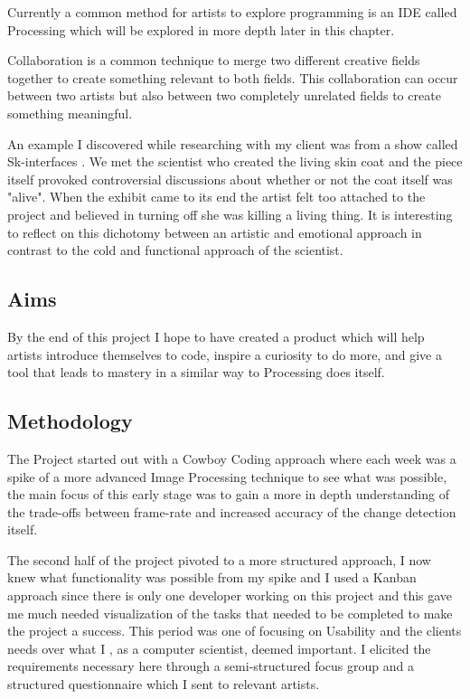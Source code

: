 \documentclass[a4paper]{report}
\begin{document}
Currently a common method for artists to explore programming is an IDE called Processing which will be explored in more depth later in this chapter.

Collaboration is a common technique to merge two different creative fields together to create something relevant to both fields. This collaboration can occur between two artists but also between two completely unrelated fields to create something meaningful. 

An example I discovered while researching with my client was from a show called Sk-interfaces \cite{SKIN}. We met the scientist who created the living skin coat and the piece itself provoked controversial discussions about whether or not the coat itself was "alive". When the exhibit came to its end the artist felt too attached to the project and believed in turning off she was killing a living thing. It is interesting to reflect on this dichotomy between an artistic and emotional approach in contrast to the cold and functional approach of the scientist.

\subsection{Aims}
By the end of this project I hope to have created a product which will help artists introduce themselves to code, inspire a curiosity to do more, and give a tool that leads to mastery in a similar way to Processing\cite{PROCESSING} does itself.

\subsection{Methodology}
The Project started out with a Cowboy Coding approach where each week was a spike of a more advanced Image Processing technique to see what was possible, the main focus of this early stage was to gain a more in depth understanding of the trade-offs between frame-rate and increased accuracy of the change detection itself.

The second half of the project pivoted to a more structured approach, I now knew what functionality was possible from my spike and I used a Kanban\cite{KANBAN} approach since there is only one developer working on this project and this gave me much needed visualization of the tasks that needed to be completed to make the project a success. This period was one of focusing on Usability and the clients needs over what I , as a computer scientist, deemed important. I elicited the requirements necessary here through a semi-structured focus group and a structured questionnaire which I sent to relevant artists.
\end{document}
